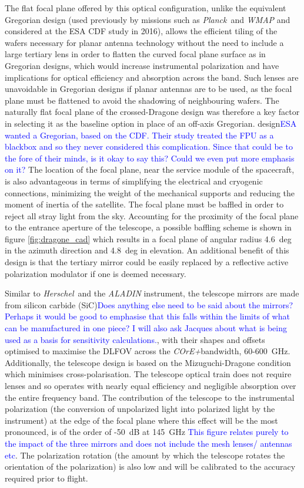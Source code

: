 \documentclass[11pt,a4paper]{article}
\newcommand{\comblue}[1]{\textcolor{blue}{#1}}
\newcommand{\coreplus}{\textit{\negthinspace COrE+\/}}
\newcommand{\planck}{\textit{\negthinspace Planck\/}}
\newcommand{\herschel}{\textit{\negthinspace Herschel\/}}
\begin{document}
The flat focal plane offered by this optical configuration, unlike the equivalent Gregorian design (used previously by missions such as \planck\ and \textit{WMAP} and considered at the ESA CDF study in 2016), allows the efficient tiling of the wafers necessary for planar antenna technology without the need to include a large tertiary lens in order to flatten the curved focal plane surface as in Gregorian designs, which would increase instrumental polarization and have implications for optical efficiency and absorption across the band. Such lenses are unavoidable in Gregorian designs if planar antennas are to be used, as the focal plane must be flattened to avoid the shadowing of neighbouring wafers. The naturally flat focal plane of the crossed-Dragone design was therefore a key factor in selecting it as the baseline option in place of an off-axis Gregorian. design\comblue{ESA wanted a Gregorian, based on the CDF. Their study treated the FPU as a blackbox and so they never considered this complication. Since that could be to the fore of their minds, is it okay to say this? Could we even put more emphasis on it?} The location of the focal plane, near the service module of the spacecraft, is also advantageous in terms of simplifying the electrical and cryogenic connections, minimizing the weight of the mechanical supports and reducing the moment of inertia of the satellite. The focal plane must be baffled in order to reject all stray light from the sky. Accounting for the proximity of the focal plane to the entrance aperture of the telescope, a possible baffling scheme is shown in figure \ref{fig:dragone_cad} which results in a focal plane of angular radius 4.6~deg in the azimuth direction and 4.8~deg in elevation. An additional benefit of this design is that the tertiary mirror could be easily replaced by a reflective active polarization modulator if one is deemed necessary.

Similar to \herschel\ and the \textit{ALADIN} instrument, the telescope mirrors are made from silicon carbide (SiC)\comblue{Does anything else need to be said about the mirrors? Perhaps it would be good to emphasise that this falls within the limits of what can be manufactured in one piece? I will also ask Jacques about what is being used as a basis for sensitivity calculations.}, with their shapes and offsets optimised to maximise the DLFOV across the \coreplus bandwidth, 60-600~GHz. Additionally, the telescope design is based on the Mizuguchi-Dragone condition which minimises cross-polarisation. The telescope optical train does not require lenses and so operates with nearly equal efficiency and negligible absorption over the entire frequency band. The contribution of the telescope to the instrumental polarization (the conversion of unpolarized light into polarized light by the instrument) at the edge of the focal plane where this effect will be the most pronounced, is of the order of -50~dB at 145~GHz \comblue{This figure relates purely to the impact of the three mirrors and does not include the mesh lenses/ antennas etc}. The polarization rotation (the amount by which the telescope rotates the orientation of the polarization) is also low and will be calibrated to the accuracy required prior to flight.
\end{document}
